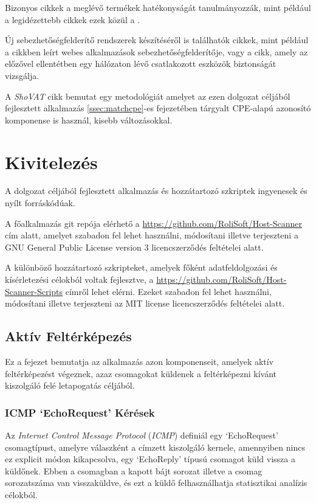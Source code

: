 \documentclass[a4paper,12pt]{article}
\begin{document}
	Bizonyos cikkek a meglévő termékek hatékonyságát tanulmányozzák, mint például a legidézettebb cikkek ezek közül a \cite{holm11,bau10,doupe10}.
	
	Új sebezhetőségfelderítő rendszerek készítéséről is találhatók cikkek, mint például a \cite{kals06} cikkben leírt webes alkalmazások sebezhetőségfelderítője, vagy a \cite{guo05} cikk, amely az előzővel ellentétben egy hálózaton lévő csatlakozott eszközök biztonságát vizsgálja.
	
	A \textit{ShoVAT}\cite{shovat15} cikk bemutat egy metodológiát amelyet az ezen dolgozat céljából fejlesztett alkalmazás \ref{ssec:matchcpe}-es fejezetében tárgyalt CPE-alapú azonosító komponense is használ, kisebb változásokkal.

\section{Kivitelezés}

	A dolgozat céljából fejlesztett alkalmazás és hozzátartozó szkriptek ingyenesek és nyílt forráskódúak.

	A főalkalmazás git repója elérhető a \url{https://github.com/RoliSoft/Host-Scanner} cím alatt, amelyet szabadon fel lehet használni, módosítani illetve terjeszteni a GNU General Public License version 3\cite{gplv3} licencszerződés feltételei alatt.
	
	A különböző hozzátartozó szkripteket, amelyek főként adatfeldolgozási és kísérletezési célokból voltak fejlesztve, a \url{https://github.com/RoliSoft/Host-Scanner-Scripts} címről lehet elérni. Ezeket szabadon fel lehet használni, módosítani illetve terjeszteni az MIT license\cite{mit} licencszerződés feltételei alatt.

\subsection{Aktív Feltérképezés}

	Ez a fejezet bemutatja az alkalmazás azon komponenseit, amelyek aktív feltérképezést végeznek, azaz csomagokat küldenek a feltérképezni kívánt kiszolgáló felé letapogatás céljából.

\subsubsection{ICMP `EchoRequest' Kérések} \label{ssec:icmpping}

	Az \textit{Internet Control Message Protocol} (\textit{ICMP}) definiál egy `EchoRequest' csomagtípust, amelyre válaszként a címzett kiszolgáló kernele, amennyiben nincs ez explicit módon kikapcsolva, egy `EchoReply' típusú csomagot küld vissza a küldőnek. Ebben a csomagban a kapott bájt sorozat illetve a csomag sorozatszáma van visszaküldve, és ezt a küldő felhasználhatja statisztikai analízis célokból.
\end{document}
